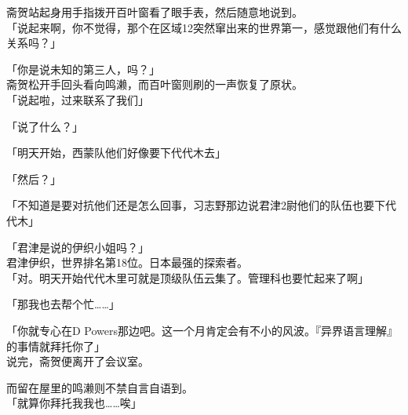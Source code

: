 斋贺站起身用手指拨开百叶窗看了眼手表，然后随意地说到。\\

「说起来啊，你不觉得，那个在区域12突然窜出来的世界第一，感觉跟他们有什么关系吗？」

「你是说未知的第三人，吗？」\\

斋贺松开手回头看向鸣濑，而百叶窗则刷的一声恢复了原状。\\

「说起啦，过来联系了我们」

「说了什么？」

「明天开始，西蒙队他们好像要下代代木去」

「然后？」

「不知道是要对抗他们还是怎么回事，习志野那边说君津2尉他们的队伍也要下代代木」

「君津是说的伊织小姐吗？」\\

君津伊织，世界排名第18位。日本最强的探索者。\\

「对。明天开始代代木里可就是顶级队伍云集了。管理科也要忙起来了啊」

「那我也去帮个忙……」

「你就专心在D Powers那边吧。这一个月肯定会有不小的风波。『异界语言理解』的事情就拜托你了」\\

说完，斋贺便离开了会议室。

而留在屋里的鸣濑则不禁自言自语到。\\

「就算你拜托我我也……唉」\\
